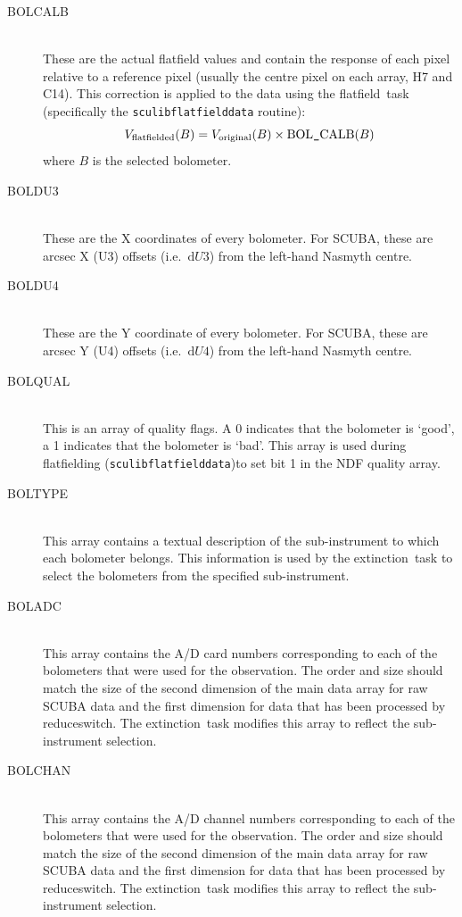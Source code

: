 \documentclass[twoside,11pt]{article}
\newcommand{\task}[1]{{\sf #1}}
\newcommand{\resw}{\xref{\task{reduce\_switch}}{sun216}{REDUCE_SWITCH}}
\newcommand{\flatf}{\xref{\task{flatfield}}{sun216}{FLATFIELD}}
\newcommand{\ext}{\xref{\task{extinction}}{sun216}{EXTINCTION}}
\newcommand{\xref}[3]{#1}
\renewcommand{\_}{\texttt{\symbol{95}}}
\begin{document}
\begin{description}
\item[BOL\_CALB]\mbox{} \\
These are the actual flatfield values and contain the response of each pixel
relative to a reference pixel (usually the centre pixel on each array, H7 and
C14). This correction is applied to the data using the \flatf\ task
(specifically the \texttt{sculib\_flatfield\_data} routine):
\begin{equation}
V_\mathrm{flatfielded}(B) = V_\mathrm{original}(B) \times \mathrm{BOL\_CALB}(B)
\end{equation}
where $B$ is the selected bolometer.

\item[BOL\_DU3]\mbox{} \\
These are the X coordinates of every bolometer. For SCUBA, these are arcsec X
(U3) offsets (i.e.\ $\mathrm{d}U3$) from the left-hand Nasmyth centre.

\item[BOL\_DU4]\mbox{} \\
These are the Y coordinate of every bolometer. For SCUBA, these are arcsec Y
(U4) offsets (i.e.\ $\mathrm{d}U4$) from the left-hand Nasmyth centre.

\item[BOL\_QUAL]\mbox{} \\
This is an array of quality flags. A 0 indicates that the bolometer is `good', 
a 1 indicates that the bolometer is `bad'. This array is used during
flatfielding (\texttt{sculib\_flatfield\_data})to set bit 1 in the NDF
quality array.

\item[BOL\_TYPE]\mbox{}\\
This array contains a textual description of the sub-instrument to which each
bolometer belongs. This information is used by the \ext\ task to select the
bolometers from the specified sub-instrument.

\item[BOL\_ADC]\mbox{}\\
This array contains the A/D card numbers corresponding to each of the
bolometers that were used for the observation. The order and size should match
the size of the second dimension of the main data array for raw SCUBA data and 
the first dimension for data that has been processed by \resw. The \ext\ task
modifies this array to reflect the sub-instrument selection.

\item[BOL\_CHAN]\mbox{}\\
This array contains the A/D channel numbers corresponding to each of the
bolometers that were used for the observation. The order and size should match
the size of the second dimension of the main data array for raw SCUBA data and 
the first dimension for data that has been processed by \resw. The \ext\ task
modifies this array to reflect the sub-instrument selection.


\end{description}
\end{document}
